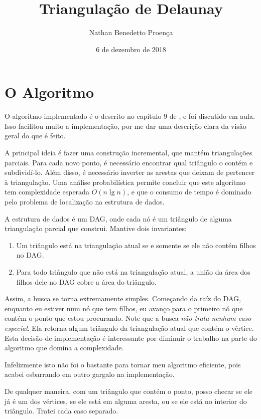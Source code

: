 \documentclass[10pt,reqno,a4paper]{article}
\title{Triangulação de Delaunay}
\author{Nathan Benedetto Proença}
\date{6 de dezembro de 2018}
\begin{document}
\maketitle
\section{O Algoritmo}

O algoritmo implementado é o descrito no capítulo 9 de \cite{DeBerg},
e foi discutido em aula. Isso facilitou muito a implementação, por me dar
uma descrição clara da visão geral do que é feito.

A principal ideia é fazer uma construção incremental, que mantém triangulações
parciais. Para cada novo ponto, é necessário encontrar qual triângulo o contém
e subdividí-lo. Além disso, é necessário inverter as arestas que deixam de
pertencer à triangulação. Uma análise probabilística permite concluir que
este algoritmo tem complexidade esperada $O(n\lg n)$, e que o consumo de tempo
é dominado pelo problema de localização na estrutura de dados.

A estrutura de dados é um DAG, onde cada nó é um triângulo de alguma
triangulação parcial que construi. Mantive dois invariantes:

\begin{enumerate}
    \item Um triângulo está na triangulação atual se e somente se ele
        não contém filhos no DAG.
    \item Para todo triângulo que não está na triangulação atual, a união da
        área dos filhos dele no DAG cobre a área do triângulo.
\end{enumerate}

Assim, a busca se torna extremamente simples. Começando da raíz do DAG,
enquanto eu estiver num nó que tem filhos, eu avanço para o primeiro nó
que contém o ponto que estou procurando. Note que a busca \emph{não trata
nenhum caso especial}. Ela retorna algum triângulo da triangulação atual
que contém o vértice. Esta decisão de implementação é interessante
por diminuir o trabalho na parte do algoritmo que domina a complexidade.

Infelizmente isto não foi o bastante para tornar meu algoritmo eficiente,
pois acabei esbarrando em outro gargalo na implementação.

De qualquer maneira, com um triângulo que contém o ponto, posso checar
se ele já é um dos vértices, se ele está em alguma aresta, ou se ele
está no interior do triângulo. Tratei cada caso separado.
\end{document}
